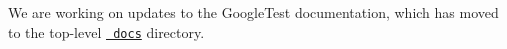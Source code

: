 We are working on updates to the Google\+Test documentation, which has moved to the top-\/level \href{../../docs}{\texttt{ docs}} directory. 
